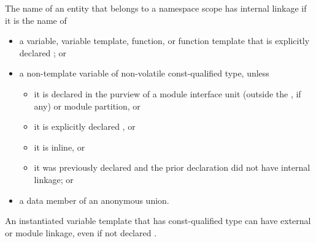 \pnum
{}%
%
%
%
%
%
The name of an entity
that belongs to a namespace scope
has internal linkage if it is the name of
\begin{itemize}
\item
  a variable, variable template, function, or function template that is
  explicitly declared ; or
\item
  a non-template variable of non-volatile const-qualified type, unless
  \begin{itemize}
  \item it is declared in the purview of a module interface unit
    (outside the , if any) or
    module partition, or
  \item it is explicitly declared , or
  \item it is inline, or
  \item it was previously declared and the prior declaration did
  not have internal linkage; or
  \end{itemize}
\item
  a data member of an anonymous union.
\end{itemize}
\begin{note}
An instantiated variable template that has const-qualified type
can have external or module linkage, even if not declared .
\end{note}


